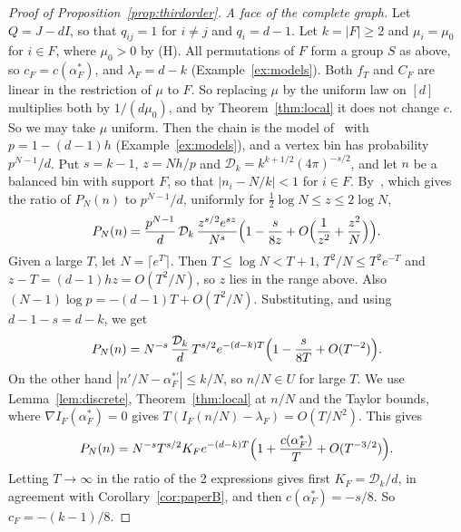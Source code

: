 \begin{proof}[Proof of Proposition~\ref{prop:thirdorder}]
\emph{A face of the complete graph.} Let $Q=J-dI$, so that $q_{ij}=1$ for
$i\ne j$ and $q_i=d-1$. Let $k=|F|\ge2$ and $\mu_i=\mu_0$ for $i\in F$, where
$\mu_0>0$ by (H). All permutations of $F$ form a group $S$ as above, so
$c_F=c(\alpha^*_F)$, and $\lambda_F=d-k$ (Example~\ref{ex:models}). Both $f_T$
and $C_F$ are linear in the restriction of $\mu$ to $F$. So replacing $\mu$
by the uniform law on $[d]$ multiplies both by $1/(d\mu_0)$, and by
Theorem~\ref{thm:local} it does not change $c$. So we may take $\mu$ uniform.
Then the chain is the model of~\cite{paperB} with $p=1-(d-1)h$
(Example~\ref{ex:models}), and a vertex bin has probability $p^{N-1}/d$. Put
$s=k-1$, $z=Nh/p$ and $\mathcal D_k=k^{k+1/2}(4\pi)^{-s/2}$, and let $n$ be a balanced
bin with support $F$, so that $|n_i-N/k|<1$ for $i\in F$.
By~\cite[Eq.~(7)]{paperB}, which gives the ratio of $P_N(n)$ to $p^{N-1}/d$,
uniformly for $\frac12\log N\le z\le2\log N$,
\[
P_N(n)=\frac{p^{N-1}}d\,\mathcal D_k\,\frac{z^{s/2}e^{sz}}{N^s}
\Bigl(1-\frac s{8z}+O\Bigl(\frac1{z^2}+\frac{z^2}N\Bigr)\Bigr).
\]
Given a large $T$, let $N=\lceil e^T\rceil$. Then $T\le\log N<T+1$,
$T^2/N\le T^2e^{-T}$ and $z-T=(d-1)hz=O(T^2/N)$, so $z$ lies in the range
above. Also
$(N-1)\log p=-(d-1)T+O(T^2/N)$. Substituting, and using $d-1-s=d-k$, we get
\[
P_N(n)=N^{-s}\,\frac{\mathcal D_k}d\,T^{s/2}e^{-(d-k)T}\Bigl(1-\frac s{8T}
+O(T^{-2})\Bigr).
\]
On the other hand $|n'/N-\alpha^{*\prime}_F|\le k/N$, so $n/N\in U$ for large
$T$. We use Lemma~\ref{lem:discrete}, Theorem~\ref{thm:local} at $n/N$ and the
Taylor bounds, where $\nabla I_F(\alpha^*_F)=0$ gives
$T(I_F(n/N)-\lambda_F)=O(T/N^2)$. This gives
\[
P_N(n)=N^{-s}T^{s/2}K_Fe^{-(d-k)T}\Bigl(1+\frac{c(\alpha^*_F)}T
+O(T^{-3/2})\Bigr).
\]
Letting $T\to\infty$ in the ratio of the 2 expressions gives first
$K_F=\mathcal D_k/d$, in agreement with Corollary~\ref{cor:paperB}, and then
$c(\alpha^*_F)=-s/8$. So $c_F=-(k-1)/8$.
\end{proof}
